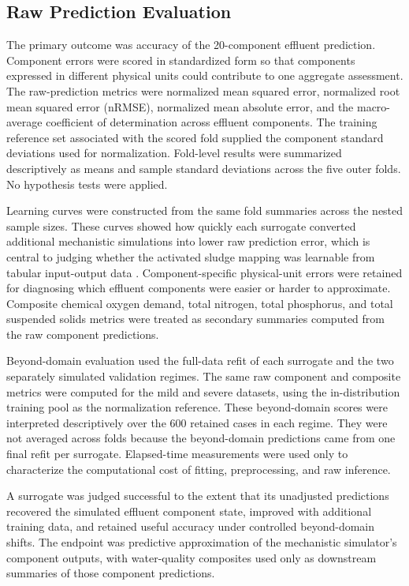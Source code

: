 \documentclass[12pt, twoside]{book}
\begin{document}
\subsection{Raw Prediction Evaluation}

The primary outcome was accuracy of the 20-component effluent prediction. Component errors were scored in
standardized form so that components expressed in different physical units could contribute to one aggregate
assessment. The raw-prediction metrics were normalized mean squared error, normalized root mean squared error
(nRMSE), normalized mean absolute error, and the macro-average coefficient of determination across effluent
components. The training reference set associated with the scored fold supplied the component standard deviations used for
normalization. Fold-level results were summarized descriptively as means and sample standard deviations across
the five outer folds. No hypothesis tests were applied.

Learning curves were constructed from the same fold summaries across the nested sample sizes. These curves
showed how quickly each surrogate converted additional mechanistic simulations into lower raw prediction
error, which is central to judging whether the activated sludge mapping was learnable from tabular
input-output data \citep{VieringLoog2023}. Component-specific physical-unit errors were retained for
diagnosing which effluent components were easier or harder to approximate. Composite chemical oxygen demand,
total nitrogen, total phosphorus, and total suspended solids metrics were treated as secondary summaries
computed from the raw component predictions.

Beyond-domain evaluation used the full-data refit of each surrogate and the two separately simulated
validation regimes. The same raw component and composite metrics were computed for the mild and severe
datasets, using the in-distribution training pool as the normalization reference. These beyond-domain scores
were interpreted descriptively over the 600 retained cases in each regime. They were not averaged across folds
because the beyond-domain predictions came from one final refit per surrogate. Elapsed-time measurements were
used only to characterize the computational cost of fitting, preprocessing, and raw inference.

A surrogate was judged successful to the extent that its unadjusted predictions recovered the simulated
effluent component state, improved with additional training data, and retained useful accuracy under
controlled beyond-domain shifts. The endpoint was predictive approximation of the mechanistic simulator's
component outputs, with water-quality composites used only as downstream summaries of those component
predictions.
\end{document}
